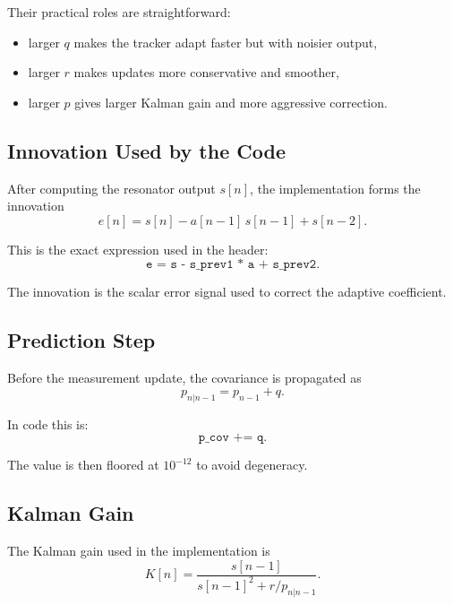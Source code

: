\documentclass[conference]{IEEEtran}
\begin{document}
    Their practical roles are straightforward:
    \begin{itemize}[leftmargin=1.4em]
        \item larger $q$ makes the tracker adapt faster but with noisier output,
        \item larger $r$ makes updates more conservative and smoother,
        \item larger $p$ gives larger Kalman gain and more aggressive correction.
    \end{itemize}

    \subsection{Innovation Used by the Code}

    After computing the resonator output $s[n]$, the implementation forms the
    innovation
    \begin{equation}\label{eq:innovation}
    e[n] = s[n] - a[n-1]\,s[n-1] + s[n-2].
    \end{equation}

    This is the exact expression used in the header:
    \begin{equation}
        \texttt{e = s - s\_prev1 * a + s\_prev2}.
    \end{equation}

    The innovation is the scalar error signal used to correct the adaptive
    coefficient.

    \subsection{Prediction Step}

    Before the measurement update, the covariance is propagated as
    \begin{equation}\label{eq:pred}
    p_{n|n-1} = p_{n-1} + q.
    \end{equation}

    In code this is:
    \begin{equation}
        \texttt{p\_cov += q}.
    \end{equation}

    The value is then floored at $10^{-12}$ to avoid degeneracy.

    \subsection{Kalman Gain}

    The Kalman gain used in the implementation is
    \begin{equation}\label{eq:gain}
    K[n] = \frac{s[n-1]}{s[n-1]^2 + r/p_{n|n-1}}.
    \end{equation}
\end{document}
